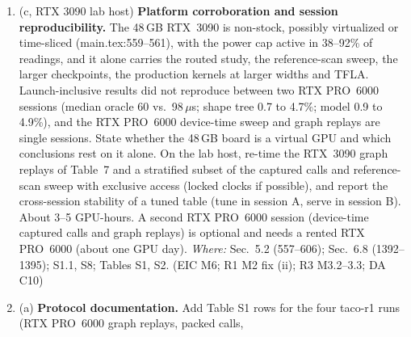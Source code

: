 \documentclass[11pt]{article}
\begin{document}
\begin{enumerate}[label=M5\alph*.]
        the placement explanation rests on an intervention only. With Nsight
        Compute where permitted (cloud containers return ERR\_NVGPUCTRPERM),
        collect for the twelve tuning keys at each chunk: achieved occupancy,
        warps per scheduler, issue-slot utilization, top stall reasons,
        local-memory load/store sectors and L2 hit rate; the L2 hit rate for
        two placements of the same input; and a per-kernel time breakdown
        versus chunk under graph replay at short and long calls for SSD
        (chunk\_cumsum, chunk\_state, state\_passing, bmm\_chunk, chunk\_scan)
        and Gated DeltaNet (cumsum, kkt, solve\_tril, recompute\_w\_u, fwd\_h,
        fwd\_o), including the empty or masked programs when $C>L$. These feed
        the mechanism figure (M8d) and the spill-proxy check (M4d). About 2--4
        GPU-hours. \emph{Where:} Sec.~4; Table~1; Sec.~6.1 ``Placement, not
        values''; Sec.~6.5. (R2 M2; ED; R2 m5)
  \item (c, RTX 3090 lab host) \textbf{Platform corroboration and session
        reproducibility.} The 48\,GB RTX~3090 is non-stock, possibly
        virtualized or time-sliced (main.tex:559--561), with the power cap
        active in 38--92\% of readings, and it alone carries the routed study,
        the reference-scan sweep, the larger checkpoints, the production
        kernels at larger widths and TFLA. Launch-inclusive results did not
        reproduce between two RTX PRO~6000 sessions (median oracle 60 vs.\
        98\,$\mu$s; shape tree 0.7 to 4.7\%; model 0.9 to 4.9\%), and the RTX
        PRO~6000 device-time sweep and graph replays are single sessions.
        State whether the 48\,GB board is a virtual GPU and which conclusions
        rest on it alone. On the lab host, re-time the RTX~3090 graph replays
        of Table~7 and a stratified subset of the captured calls and
        reference-scan sweep with exclusive access (locked clocks if
        possible), and report the cross-session stability of a tuned table
        (tune in session A, serve in session B). About 3--5 GPU-hours. A
        second RTX PRO~6000 session (device-time captured calls and graph
        replays) is optional and needs a rented RTX PRO~6000 (about one GPU
        day). \emph{Where:} Sec.~5.2 (557--606); Sec.~6.8 (1392--1395);
        S1.1, S8; Tables S1, S2. (EIC M6; R1 M2 fix (ii); R3 M3.2--3.3; DA
        C10)
  \item (a) \textbf{Protocol documentation.} Add Table S1 rows for the four
        taco-r1 runs (RTX PRO~6000 graph replays, packed calls,

\end{enumerate}
\end{document}

